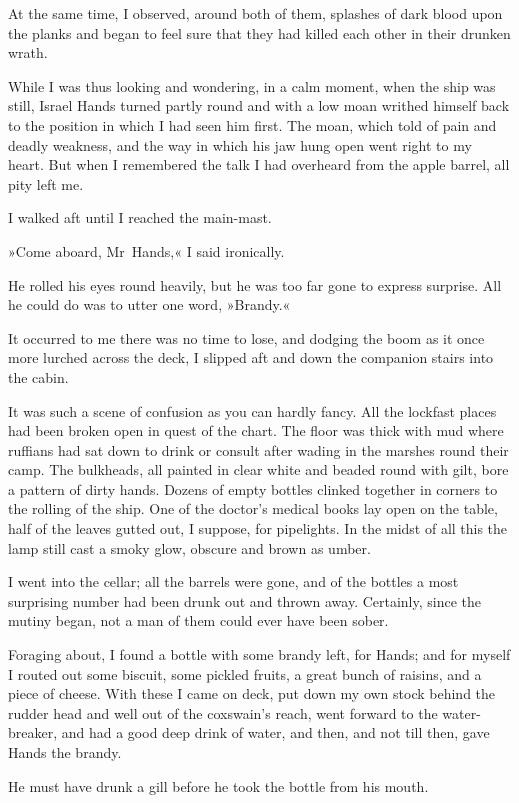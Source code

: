 At the same time, I observed, around both of them, splashes of dark blood upon the planks and began to feel sure that they had killed each other in their drunken wrath.

While I was thus looking and wondering, in a calm moment, when the ship was still, Israel Hands turned partly round and with a low moan writhed himself back to the position in which I had seen him first. The moan, which told of pain and deadly weakness, and the way in which his jaw hung open went right to my heart. But when I remembered the talk I had overheard from the apple barrel, all pity left me.

I walked aft until I reached the main-mast.

»Come aboard, Mr~Hands,« I said ironically.

He rolled his eyes round heavily, but he was too far gone to express surprise. All he could do was to utter one word, »Brandy.«

It occurred to me there was no time to lose, and dodging the boom as it once more lurched across the deck, I slipped aft and down the companion stairs into the cabin.

It was such a scene of confusion as you can hardly fancy. All the lockfast places had been broken open in quest of the chart. The floor was thick with mud where ruffians had sat down to drink or consult after wading in the marshes round their camp. The bulkheads, all painted in clear white and beaded round with gilt, bore a pattern of dirty hands. Dozens of empty bottles clinked together in corners to the rolling of the ship. One of the doctor's medical books lay open on the table, half of the leaves gutted out, I suppose, for pipelights. In the midst of all this the lamp still cast a smoky glow, obscure and brown as umber.

I went into the cellar; all the barrels were gone, and of the bottles a most surprising number had been drunk out and thrown away. Certainly, since the mutiny began, not a man of them could ever have been sober.

Foraging about, I found a bottle with some brandy left, for Hands; and for myself I routed out some biscuit, some pickled fruits, a great bunch of raisins, and a piece of cheese. With these I came on deck, put down my own stock behind the rudder head and well out of the coxswain's reach, went forward to the water-breaker, and had a good deep drink of water, and then, and not till then, gave Hands the brandy.

He must have drunk a gill before he took the bottle from his mouth.

